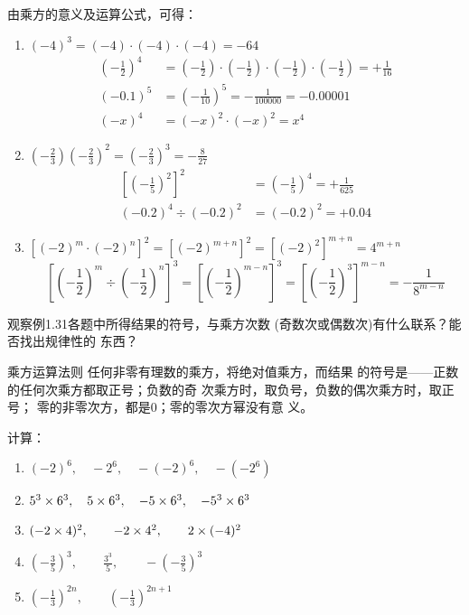 \begin{solution}
	由乘方的意义及运算公式，可得：
	\begin{enumerate}
		\item $(-4)^3=(-4)\cdot (-4)\cdot (-4)=-64$
		\[\begin{split}
		\left(-\frac{1}{2}\right)^4&=\left(-\frac{1}{2}\right)\cdot\left(-\frac{1}{2}\right)\cdot\left(-\frac{1}{2}\right)\cdot\left(-\frac{1}{2}\right)=+\frac{1}{16}\\
		(-0.1)^5&=\left(-\frac{1}{10}\right)^5=-\frac{1}{100000}=-0.00001\\
		(-x)^4&=(-x)^2\cdot (-x)^2=x^4
		\end{split}\]
		\item $\left(-\frac{2}{3}\right)\left(-\frac{2}{3}\right)^2=\left(-\frac{2}{3}\right)^3=-\frac{8}{27}$
		\[\begin{split}
		\left[\left(-\frac{1}{5}\right)^2\right]^2&=\left(-\frac{1}{5}\right)^4=+\frac{1}{625}\\
		(-0.2)^4\div (-0.2)^2&=(-0.2)^2=+0.04
		\end{split}\]
		\item $\left[(-2)^m\cdot (-2)^n\right]^2=[(-2)^{m+n}]^2=[(-2)^2]^{m+n}=4^{m+n}$
		\[\left[\left(-\frac{1}{2}\right)^m\div \left(-\frac{1}{2}\right)^n\right]^3=\left[\left(-\frac{1}{2}\right)^{m-n}\right]^3=\left[\left(-\frac{1}{2}\right)^3\right]^{m-n}=-\frac{1}{8^{m-n}}\]
	\end{enumerate}
\end{solution}

观察例1.31各题中所得结果的符号，与乘方次数
(奇数次或偶数次)有什么联系？能否找出规律性的
东西？

\begin{blk}{乘方运算法则}
	任何非零有理数的乘方，将绝对值乘方，而结果
	的符号是——正数的任何次乘方都取正号；负数的奇
	次乘方时，取负号，负数的偶次乘方时，取正号；
	零的非零次方，都是0；零的零次方幂没有意
	义。
\end{blk}


\begin{example}
	计算：
	\begin{enumerate}
		\item $(-2)^6,\quad -2^6,\quad -(-2)^6,\quad -(-2^6) $
		\item $5^3\times 6^3,\quad 5\times 6^3,\quad -5\times 6^3,\quad -5^3\times 6^3$
		\item $(-2\times 4)^2,\qquad -2\times 4^2,\qquad 2\times (-4)^2$
		\item $\left(-\frac{3}{5}\right)^3,\qquad \frac{3^3}{5},\qquad -\left(-\frac{3}{5}\right)^3$
		\item $\left(-\frac{1}{3}\right)^{2n},\qquad \left(-\frac{1}{3}\right)^{2n+1}$
	\end{enumerate}
\end{example}

